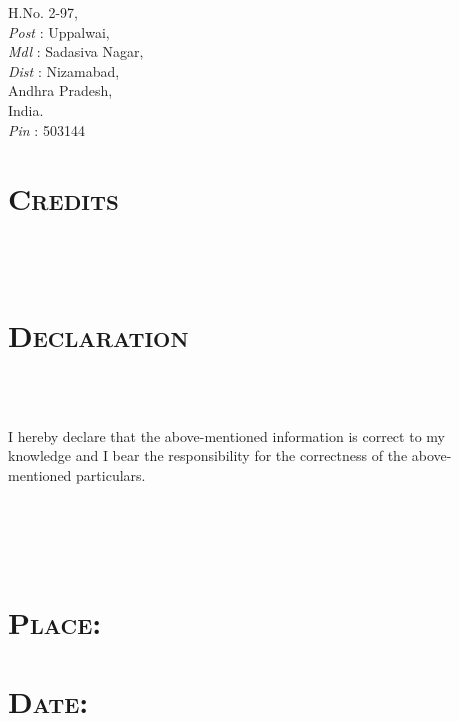 \begin{resume}
\dates{}
\begin{position}
H.No. 2-97,\\
\emph{Post} : Uppalwai,\\
\emph{Mdl} : Sadasiva Nagar,\\
\emph{Dist} : Nizamabad,\\
Andhra Pradesh,\\
India.\\
\emph{Pin} : 503144\\
\end{position}

\section{\textsc{Credits}}

\begin{formatb}
  \\
  \body\\
\end{formatb}

\dates{}
\begin{position}
\end{position}


\section{\textsc{Declaration}}

\begin{formatb}
  \\
  \body\\
\end{formatb}

I hereby declare that the above-mentioned information is
  correct to my knowledge and I bear the responsibility for the
  correctness of the above-mentioned particulars. \\\\\\\\\\

\section{\textsc{Place}:}

\section{\textsc{Date}:}
\begin{formatb}
  \\
  \body\\
\end{formatb}
\employer{}
\begin{position}
\end{position}


\end{resume}
